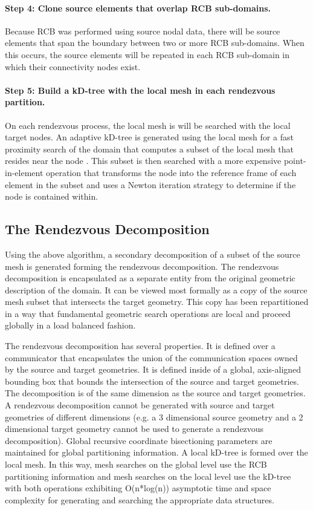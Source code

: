 \documentclass[letterpaper,12pt]{article}
\begin{document}
\paragraph{Step 4: Clone source elements that overlap RCB
  sub-domains.}  Because RCB was performed using source nodal data,
there will be source elements that span the boundary between two or
more RCB sub-domains. When this occurs, the source elements will be
repeated in each RCB sub-domain in which their connectivity nodes
exist. 

\paragraph{Step 5: Build a kD-tree with the local mesh in each rendezvous
  partition.}  On each rendezvous process, the local mesh is will be
searched with the local target nodes. An adaptive kD-tree is generated
using the local mesh for a fast proximity search of the domain that
computes a subset of the local mesh that resides near the node
\cite{Bentley_1975}. This subset is then searched with a more
expensive point-in-element operation that transforms the node into the
reference frame of each element in the subset and uses a Newton
iteration strategy to determine if the node is contained within.

\subsection{The Rendezvous Decomposition}\label{subsec:rendezvous_decomp}
Using the above algorithm, a secondary decomposition of a subset of
the source mesh is generated forming the rendezvous decomposition. The
rendezvous decomposition is encapsulated as a separate entity from the
original geometric description of the domain. It can be viewed most
formally as a copy of the source mesh subset that intersects the
target geometry. This copy has been repartitioned in a way that
fundamental geometric search operations are local and proceed globally
in a load balanced fashion.

The rendezvous decomposition has several properties. It is defined
over a communicator that encapsulates the union of the communication
spaces owned by the source and target geometries. It is defined inside
of a global, axis-aligned bounding box that bounds the intersection of
the source and target geometries. The decomposition is of the same
dimension as the source and target geometries. A rendezvous
decomposition cannot be generated with source and target geometries of
different dimensions (e.g. a 3 dimensional source geometry and a 2
dimensional target geometry cannot be used to generate a rendezvous
decomposition). Global recursive coordinate bisectioning parameters
are maintained for global partitioning information. A local kD-tree is
formed over the local mesh. In this way, mesh searches on the global
level use the RCB partitioning information and mesh searches on the
local level use the kD-tree with both operations exhibiting
O(n*log(n)) asymptotic time and space complexity for generating and
searching the appropriate data structures.
\end{document}

